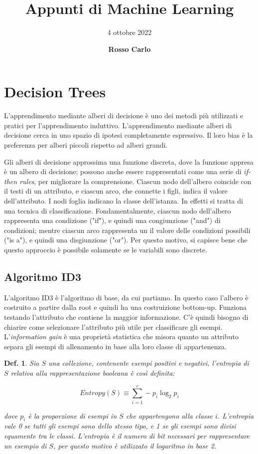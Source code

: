 \documentclass{article}
\title{\vspace{2cm}\textbf{Appunti di Machine Learning}}
\author{\vspace{3mm}4 ottobre 2022}
\date{\vspace{3mm} \textbf{Rosso Carlo}}
\newtheorem{definition}{Def.}[section]
\begin{document}
\begin{titlepage}
	\maketitle
	\thispagestyle{empty}
\end{titlepage}
\tableofcontents
\newpage

\section{Decision Trees}
L'apprendimento mediante alberi di decisione è uno dei metodi più utilizzati e
pratici per l'apprendimento induttivo. L'apprendimento mediante alberi di
decisione cerca in uno spazio di ipotesi completamente espressivo. Il loro bias
è la preferenza per alberi piccoli rispetto ad alberi grandi.

Gli alberi di decisione approssima una funzione discreta, dove la funzione
appresa è un albero di decisione; possono anche essere rappresentati come una
serie di \textit{if-then rules}, per migliorare la comprensione.
Ciascun nodo dell'albero coincide con il testi di un attributo, e ciascun arco,
che connette i figli, indica il valore dell'attributo. I nodi foglia indicano
la classe dell'istanza. In effetti si tratta di una tecnica di classificazione.
Fondamentalmente, ciascun nodo dell'albero rappresenta una condizione ("if"),
e quindi una congiunzione ("and") di condizioni; mentre ciascun arco rappresenta
un il valore delle condizioni possibili ("is a"), e quindi una disgiunzione
("or"). Per questo motivo, si capisce bene che questo approccio è possibile
solamente se le variabili sono discrete.

\subsection{Algoritmo ID3}
L'algoritmo ID3 è l'algoritmo di base, da cui partiamo. In questo caso l'albero
è costruito a partire dalla root e quindi ha una costruizione bottom-up.
Funziona testando l'attributo che contiene la maggior informazione. C'è quindi
bisogno di chiarire come selezionare l'attributo più utile per classificare gli
esempi. L'\textit{information gain} è una proprietà statistica che misora quanto
un attributo separa gli esempi di allenamento in base alla loro classe di
appartenenza.

\begin{definition}
	Sia $S$ una collezione, contenente esempi positivi e negativi, l'entropia di 
	$S$ relativa alla rappresentazione booleana è così definita:

	\begin{equation}
		Entropy(S) \equiv \sum_{i=1}^c-p_i \log_2 p_i
	\end{equation}

	dove $p_i$ è la proporzione di esempi in $S$ che appartengono alla classe 
	$i$. L'entropia vale 0 se tutti gli esempi sono dello stesso tipo, e 1 se 
	gli esempi sono divisi equamente tra le classi.
	L'entropia è il numero di bit necessari per rappresentare un esempio di $S$, 
	per questo motivo è utilizzato il logaritmo in base 2.
\end{definition}
\end{document}
